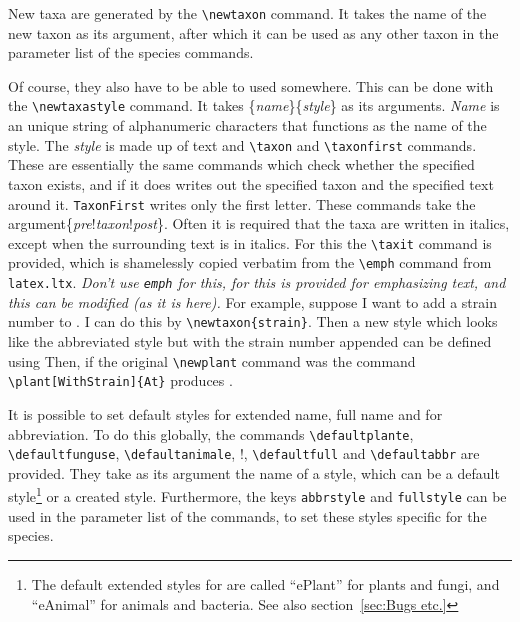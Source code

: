 \documentclass{article}
\makeatletter
\newenvironment{breakverbatim}{\def\@xobeysp{\ }\verbatim}{\endverbatim}
\makeatother
\begin{document}
New taxa are generated by the \verb!\newtaxon! command. It takes the name of the new taxon as its argument, after which it can be used as any other taxon in the parameter list of the species commands.

Of course, they also have to be able to used somewhere. This can be done with the \verb!\newtaxastyle! command. It takes \{\textit{name}\}\{\textit{style}\} as its arguments. \textit{Name} is an unique string of alphanumeric characters that functions as the name of the style. The \textit{style} is made up of text and \verb!\taxon! and \verb!\taxonfirst! commands. These are essentially the same commands which check whether the specified taxon exists, and if it does writes out the specified taxon and the specified text around it. \verb!TaxonFirst! writes only the first letter. These commands take the argument\{\textit{pre}!\textit{taxon}!\textit{post}\}. Often it is required that the taxa are written in italics, except when the surrounding text is in italics. For this the \verb!\taxit! command is provided, which is shamelessly copied verbatim from the \verb!\emph! command from \texttt{latex.ltx}. \emph{Don't use \texttt{emph} for this, for this is provided for emphasizing text, and this can be modified (as it is here).} For example, suppose I want to add a strain number to . I can do this by \verb!\newtaxon{strain}!. Then a new style which looks like the abbreviated style but with the strain number appended can be defined using \begin{breakverbatim}\end{breakverbatim}
Then, if the original \verb!\newplant! command was \begin{breakverbatim}\end{breakverbatim}
the command \verb!\plant[WithStrain]{At}! produces .

It is possible to set default styles for extended name, full name and for abbreviation. To do this globally, the commands \verb!\defaultplante!, \verb!\defaultfunguse!, \verb!\defaultanimale!, !, \verb!\defaultfull! and \verb!\defaultabbr! are provided. They take as its argument the name of a style, which  can be a default style\footnote{The default extended styles for are called ``ePlant'' for plants and fungi, and ``eAnimal'' for animals and bacteria. See also section~\ref{sec:Bugs etc.}} or a created style. Furthermore, the keys \verb!abbrstyle! and \verb!fullstyle! can be used in the parameter list of the commands, to set these styles specific for the species.
\end{document}
